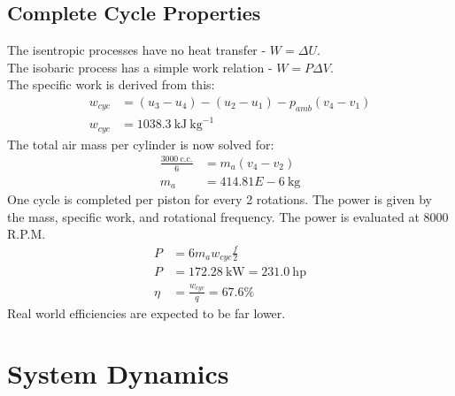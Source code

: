 \documentclass[10pt,a4paper]{article}
\begin{document}
	\subsection*{Complete Cycle Properties}
	The isentropic processes have no heat transfer - $W = \Delta U$.\\
	The isobaric process has a simple work relation - $W = P \Delta V$.\\
	The specific work is derived from this:
	\begin{align}
		w_{cyc} &= (u_3-u_4) - (u_2-u_1) - p_{amb}(v_4 - v_1) \\
		w_{cyc} &= 1038.3\ \text{kJ}\ \text{kg}^{-1}
	\end{align}
	The total air mass per cylinder is now solved for:
	\begin{align}
		\frac{3000\ \text{c.c.}}{6} &= m_a(v_4-v_2)\\
		m_a &= 414.81E-6\ \text{kg}
	\end{align}
	One cycle is completed per piston for every 2 rotations. The power is given by the mass, specific work, and rotational frequency. The power is evaluated at 8000 R.P.M.
	\begin{align}
		P &= 6 m_a w_{cyc} \frac{f}{2}\\
		P &= 172.28\ \text{kW}= 231.0\ \text{hp}\\
		\eta &= \frac{w_{cyc}}{q}= 67.6 \%
	\end{align}
	Real world efficiencies are expected to be far lower.
	\newpage
	
	\section*{System Dynamics}
	
\end{document}
